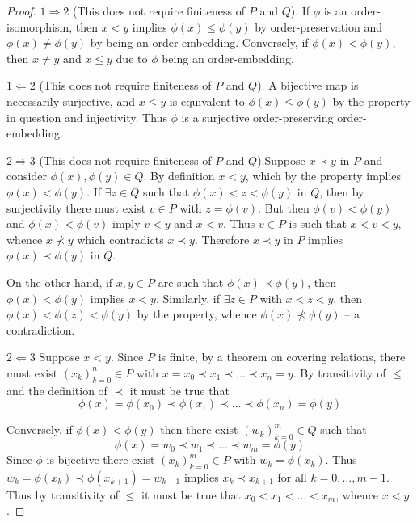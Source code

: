 \documentclass[a4paper]{article}
\newcommand{\brac}[1]{{\left ( #1 \right )}}
\begin{document}
\begin{proof}
$1 \Rightarrow 2$ (This does not require finiteness of $P$ and $Q$). If $\phi$ is an order-isomorphism, then $x<y$ implies $\phi(x)\leq \phi(y)$ by order-preservation and $\phi(x)\neq \phi(y)$ by being an order-embedding. Conversely, if $\phi(x) < \phi(y)$, then $x\neq y$ and $x\leq y$ due to $\phi$ being an order-embedding.

$1 \Leftarrow 2$ (This does not require finiteness of $P$ and $Q$). A bijective map is necessarily surjective, and $x\leq y$ is equivalent to $\phi(x)\leq \phi(y)$ by the property in question and injectivity. Thus $\phi$ is a surjective order-preserving order-embedding.

$2 \Rightarrow 3$ (This does not require finiteness of $P$ and $Q$).Suppose $x\prec y$ in $P$ and consider $\phi(x),\phi(y)\in Q$. By definition $x<y$, which by the property implies $\phi(x)<\phi(y)$. If $\exists z\in Q$ such that $\phi(x)<z<\phi(y)$ in $Q$, then by surjectivity there must exist $v\in P$ with $z=\phi(v)$. But then $\phi(v)<\phi(y)$ and $\phi(x)<\phi(v)$ imply $v<y$ and $x<v$. Thus $v\in P$ is such that $x<v<y$, whence $x\not\prec y$ which contradicts $x\prec y$. Therefore $x\prec y$ in $P$ implies $\phi(x)\prec \phi(y)$ in $Q$.

On the other hand, if $x,y\in P$ are such that $\phi(x)\prec \phi(y)$, then $\phi(x)< \phi(y)$ implies $x<y$. Similarly, if $\exists z\in P$ with $x<z<y$, then $\phi(x)<\phi(z)<\phi(y)$ by the property, whence $\phi(x)\not\prec \phi(y)$ -- a contradiction.

$2 \Leftarrow 3$ Suppose $x<y$. Since $P$ is finite, by a theorem on covering relations, there must exist $\brac{x_k}_{k=0}^n\in P$ with $x=x_0 \prec x_1 \prec \ldots \prec x_n=y$. By transitivity of $\leq$ and the definition of $\prec$ it must be true that \[\phi(x) = \phi(x_0) \prec \phi(x_1) \prec \ldots \prec \phi(x_n) = \phi(y)\]

Conversely, if $\phi(x) < \phi(y)$ then there exist $\brac{w_k}_{k=0}^m\in Q$ such that \[\phi(x) = w_0 \prec w_1 \prec \ldots \prec w_m = \phi(y)\] Since $\phi$ is bijective there exist $\brac{x_k}_{k=0}^m\in P$ with $w_k=\phi(x_k)$. Thus $w_k = \phi(x_k)\prec \phi(x_{k+1})=w_{k+1}$ implies $x_k\prec x_{k+1}$ for all $k=0,\ldots,{m-1}$. Thus by transitivity of $\leq$ it must be true that $x_0<x_1<\ldots<x_m$, whence $x<y$.
\end{proof}

\end{document}
